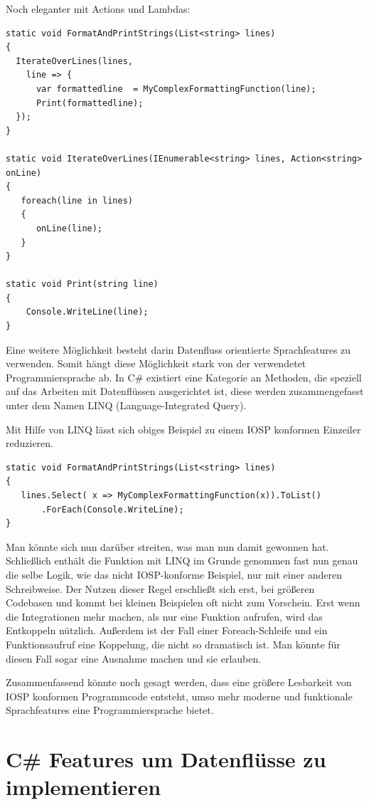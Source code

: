 Noch eleganter mit Actions und Lambdas:

\begin{lstlisting}[caption=FormatAndPrintStrings Variante 3]
static void FormatAndPrintStrings(List<string> lines)
{
  IterateOverLines(lines,
    line => {
      var formattedline  = MyComplexFormattingFunction(line);
      Print(formattedline);
  });
}

static void IterateOverLines(IEnumerable<string> lines, Action<string> onLine)
{
   foreach(line in lines)
   {
      onLine(line);
   }
}

static void Print(string line)
{
    Console.WriteLine(line);
}
\end{lstlisting}


Eine weitere Möglichkeit besteht darin Datenfluss orientierte Sprachfeatures zu verwenden.
Somit hängt diese Möglichkeit stark von der verwendetet Programmiersprache ab.
In C\# existiert eine Kategorie an Methoden, die speziell auf das Arbeiten mit Datenflüssen ausgerichtet ist, diese werden
zusammengefasst unter dem Namen LINQ (Language-Integrated Query).

\bigskip
Mit Hilfe von LINQ lässt sich obiges Beispiel zu einem IOSP konformen Einzeiler reduzieren.

\begin{lstlisting}[caption=FormatAndPrintStrings Variante LINQ]
static void FormatAndPrintStrings(List<string> lines)
{
   lines.Select( x => MyComplexFormattingFunction(x)).ToList()
	   .ForEach(Console.WriteLine);
}
\end{lstlisting}

Man könnte sich nun darüber streiten, was man nun damit gewonnen hat. Schließlich enthält die Funktion mit LINQ im Grunde
genommen fast nun genau die selbe Logik, wie das nicht IOSP-konforme Beispiel, nur mit einer anderen Schreibweise.
Der Nutzen dieser Regel erschließt sich erst, bei größeren Codebasen und kommt bei kleinen Beispielen oft nicht zum Vorschein.
Erst wenn die Integrationen mehr machen, als nur eine Funktion aufrufen, wird das Entkoppeln nützlich.
Außerdem ist der Fall einer Foreach-Schleife und ein Funktionsaufruf eine Koppelung, die nicht so dramatisch ist. Man
könnte für diesen Fall sogar eine Ausnahme machen und sie erlauben.


Zusammenfassend könnte noch gesagt werden, dass eine größere Lesbarkeit von IOSP konformen Programmcode entsteht, umso mehr moderne und funktionale
Sprachfeatures eine Programmiersprache bietet.

\section{C\# Features um Datenflüsse zu implementieren}

